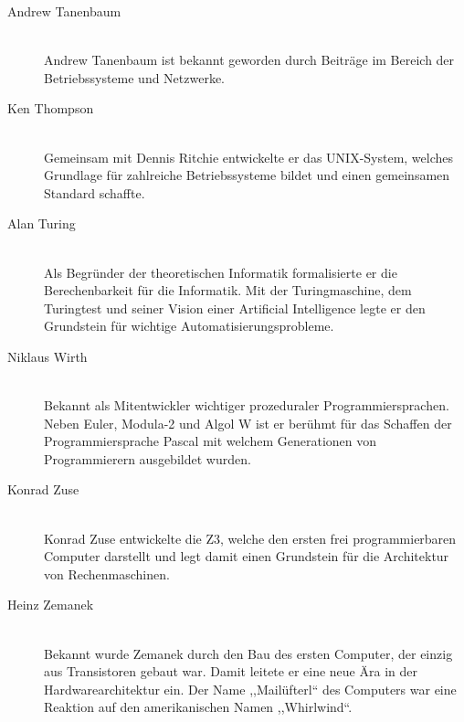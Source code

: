 \begin{description}
  \item[Andrew Tanenbaum ] \hfill{} \\
    Andrew Tanenbaum ist bekannt geworden durch Beiträge im Bereich der Betriebssysteme und Netzwerke.

  \item[Ken Thompson ] \hfill{} \\
    Gemeinsam mit Dennis Ritchie entwickelte er das UNIX-System, welches Grundlage für zahlreiche Betriebssysteme bildet und einen gemeinsamen Standard schaffte.

  \item[Alan Turing ] \hfill{} \\
    Als Begründer der theoretischen Informatik formalisierte er die Berechenbarkeit für die Informatik. Mit der Turingmaschine, dem Turingtest und seiner Vision einer Artificial Intelligence legte er den Grundstein für wichtige Automatisierungsprobleme.

  \item[Niklaus Wirth ] \hfill{} \\
    Bekannt als Mitentwickler wichtiger prozeduraler Programmiersprachen. Neben Euler, Modula-2 und Algol W ist er berühmt für das Schaffen der Programmiersprache Pascal mit welchem Generationen von Programmierern ausgebildet wurden.

  \item[Konrad Zuse ] \hfill{} \\
    Konrad Zuse entwickelte die Z3, welche den ersten frei programmierbaren Computer darstellt und legt damit einen Grundstein für die Architektur von Rechenmaschinen.

  \item[Heinz Zemanek ] \hfill{} \\
    Bekannt wurde Zemanek durch den Bau des ersten Computer, der einzig aus Transistoren gebaut war. Damit leitete er eine neue Ära in der Hardwarearchitektur ein. Der Name ,,Mailüfterl`` des Computers war eine Reaktion auf den amerikanischen Namen ,,Whirlwind``.
\end{description}
